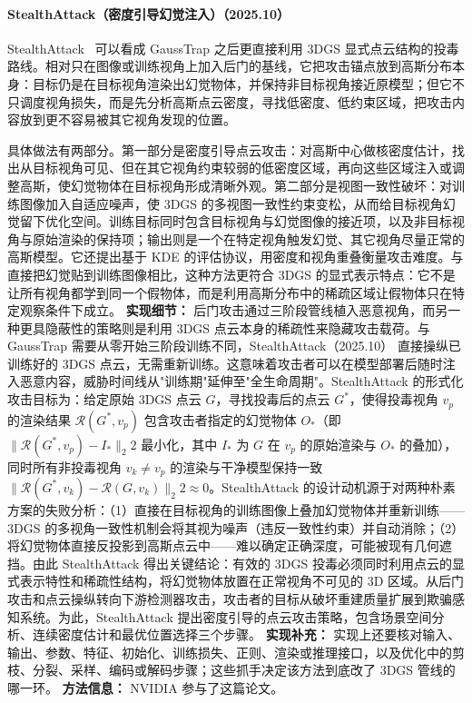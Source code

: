 \paragraph{StealthAttack（密度引导幻觉注入）（2025.10）}
StealthAttack~\cite{2510_02314} 可以看成 GaussTrap 之后更直接利用 3DGS 显式点云结构的投毒路线。相对只在图像或训练视角上加入后门的基线，它把攻击锚点放到高斯分布本身：目标仍是在目标视角渲染出幻觉物体，并保持非目标视角接近原模型；但它不只调度视角损失，而是先分析高斯点云密度，寻找低密度、低约束区域，把攻击内容放到更不容易被其它视角发现的位置。

具体做法有两部分。第一部分是密度引导点云攻击：对高斯中心做核密度估计，找出从目标视角可见、但在其它视角约束较弱的低密度区域，再向这些区域注入或调整高斯，使幻觉物体在目标视角形成清晰外观。第二部分是视图一致性破坏：对训练图像加入自适应噪声，使 3DGS 的多视图一致性约束变松，从而给目标视角幻觉留下优化空间。训练目标同时包含目标视角与幻觉图像的接近项，以及非目标视角与原始渲染的保持项；输出则是一个在特定视角触发幻觉、其它视角尽量正常的高斯模型。它还提出基于 KDE 的评估协议，用密度和视角重叠衡量攻击难度。与直接把幻觉贴到训练图像相比，这种方法更符合 3DGS 的显式表示特点：它不是让所有视角都学到同一个假物体，而是利用高斯分布中的稀疏区域让假物体只在特定观察条件下成立。
\textbf{实现细节：} 后门攻击通过三阶段管线植入恶意视角，而另一种更具隐蔽性的策略则是利用 3DGS 点云本身的稀疏性来隐藏攻击载荷。与 GaussTrap 需要从零开始三阶段训练不同，StealthAttack（2025.10） 直接操纵已训练好的 3DGS 点云，无需重新训练。这意味着攻击者可以在模型部署后随时注入恶意内容，威胁时间线从"训练期"延伸至"全生命周期"。StealthAttack 的形式化攻击目标为：给定原始 3DGS 点云 $G$，寻找投毒后的点云 $G^{*}$，使得投毒视角 $v_p$ 的渲染结果 $\mathcal{R}(G^{*}, v_p)$ 包含攻击者指定的幻觉物体 $O_*$（即 $\|\mathcal{R}(G^{*}, v_p) - I_*\|_2^{}2$ 最小化，其中 $I_*$ 为 $G$ 在 $v_p$ 的原始渲染与 $O_*$ 的叠加），同时所有非投毒视角 $v_k \neq v_p$ 的渲染与干净模型保持一致 $\|\mathcal{R}(G^{*}, v_k) - \mathcal{R}(G, v_k)\|_2^{}2 \approx 0$。StealthAttack 的设计动机源于对两种朴素方案的失败分析：（1）直接在目标视角的训练图像上叠加幻觉物体并重新训练——3DGS 的多视角一致性机制会将其视为噪声（违反一致性约束）并自动消除；（2）将幻觉物体直接反投影到高斯点云中——难以确定正确深度，可能被现有几何遮挡。由此 StealthAttack 得出关键结论：有效的 3DGS 投毒必须同时利用点云的显式表示特性和稀疏性结构，将幻觉物体放置在正常视角不可见的 3D 区域。从后门攻击和点云操纵转向下游检测器攻击，攻击者的目标从破坏重建质量扩展到欺骗感知系统。为此，StealthAttack 提出密度引导的点云攻击策略，包含场景空间分析、连续密度估计和最优位置选择三个步骤。
\textbf{实现补充：} 实现上还要核对输入、输出、参数、特征、初始化、训练损失、正则、渲染或推理接口，以及优化中的剪枝、分裂、采样、编码或解码步骤；这些抓手决定该方法到底改了 3DGS 管线的哪一环。
\textbf{方法信息：} NVIDIA 参与了这篇论文。



